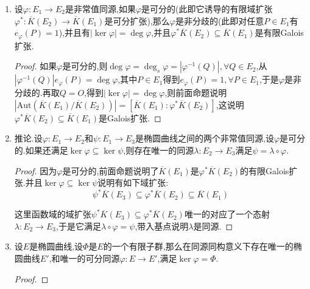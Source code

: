 \begin{enumerate}
\begin{proof}
		首先$\tau_T^*$固定$\overline{K}(E_2)$是因为,任取$f\in\overline{K}(E_2)$,则从$T\i\ker\varphi$,导致$\varphi\circ\tau_T=\varphi$,于是$\tau_T^*(\varphi^*f)=\varphi^*f$(我们把$\overline{K}(E_2)$典范的视为$\overline{K}(E_1)$的子群,就是把$f\in\overline{K}(E_2)$视为$\varphi^*f\in\overline{K}(E_1)$).这说明$\tau_T^*$固定了$\overline{K}(E_2)$(严格说是固定了$\varphi^*\overline{K}(E_2)$).于是我们的确定义了一个同态$\ker\varphi\to\mathrm{Aut}(\overline{K}(E_1)/\overline{K}(E_2))$.最后说明它是同构.我们前面证明了$|\ker\varphi|=\deg_s\varphi$,另一方面按照Galois基本定理得到$|\mathrm{Aut}(\overline{K}(E_1)/\overline{K}(E_2))|\le\deg_s\varphi$.所以只需证明$T\mapsto\tau_T^*$是单射.假设有$\tau_T^*$是$E_1$上的常值映射,那么$E_1$上的每个有理函数$f$都满足$f(T)=f(O)$,比方说把$f$选取为坐标函数,就导致$T=O$,这说明$T\mapsto\tau_T^*$是单射.
	\end{proof}
	\item 设$\varphi:E_1\to E_2$是非常值同源,如果$\varphi$是可分的(此即它诱导的有限域扩张$\varphi^*:\overline{K}(E_2)\to\overline{K}(E_1)$是可分扩张),那么$\varphi$是非分歧的(此即对任意$P\in E_1$有$e_{\varphi}(P)=1$),并且有$|\ker\varphi|=\deg\varphi$,并且$\varphi^*\overline{K}(E_2)\subseteq\overline{K}(E_1)$是有限Galois扩张.
	\begin{proof}
		
		如果$\varphi$是可分的,则$\deg\varphi=\deg_s\varphi=|\varphi^{-1}(Q)|,\forall Q\in E_2$,从$|\varphi^{-1}(Q)|e_{\varphi}(P)=\deg\varphi$,其中$P\in E_1$得到$e_{\varphi}(P)=1,\forall P\in E_1$,于是$\varphi$是非分歧的.再取$Q=O$,得到$|\ker\varphi|=\deg\varphi$,则前面命题说明$|\mathrm{Aut}(\overline{K}(E_1)/\overline{K}(E_2))|=[\overline{K}(E_1):\varphi^*\overline{K}(E_2)]$,这说明$\varphi^*\overline{K}(E_2)\subseteq\overline{K}(E_1)$是Galois扩张.
	\end{proof}
	\item 推论.设$\varphi:E_1\to E_2$和$\psi:E_1\to E_3$是椭圆曲线之间的两个非常值同源,设$\varphi$是可分的.如果还满足$\ker\varphi\subseteq\ker\psi$,则存在唯一的同源$\lambda:E_2\to E_3$满足$\psi=\lambda\circ\varphi$.
	\begin{proof}
		
		因为$\varphi$是可分的,前面命题说明了$\overline{K}(E_1)$是$\varphi^*\overline{K}(E_2)$的有限Galois扩张.并且$\ker\varphi\subseteq\ker\psi$说明有如下域扩张:
		$$\psi^*\overline{K}(E_3)\subseteq\varphi^*\overline{K}(E_2)\subseteq\overline{K}(E_1)$$
		
		这里函数域的域扩张$\psi^*\overline{K}(E_3)\subseteq\varphi^*\overline{K}(E_2)$唯一的对应了一个态射$\lambda:E_2\to E_3$,于是它满足$\lambda\circ\varphi=\psi$,带入基点说明$\lambda$是同源.
	\end{proof}
	\item 设$E$是椭圆曲线,设$\Phi$是$E$的一个有限子群,那么在同源同构意义下存在唯一的椭圆曲线$E'$,和唯一的可分同源$\varphi:E\to E'$,满足$\ker\varphi=\Phi$.
	\begin{proof}
		

\end{proof}
\end{enumerate}
